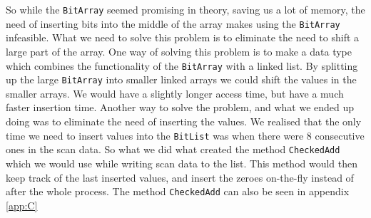 So while the \lstinline|BitArray| seemed promising in theory, saving us a lot of memory, the need of inserting bits into the middle of the array makes using the \lstinline|BitArray| infeasible.
What we need to solve this problem is to eliminate the need to shift a large part of the array. 
One way of solving this problem is to make a data type which combines the functionality of the \lstinline|BitArray| with a linked list. 
By splitting up the large \lstinline|BitArray| into smaller linked arrays we could shift the values in the smaller arrays. 
We would have a slightly longer access time, but have a much faster insertion time. 
Another way to solve the problem, and what we ended up doing was to eliminate the need of inserting the values. 
We realised that the only time we need to insert values into the \lstinline|BitList| was when there were 8 consecutive ones in the scan data. 
So what we did what created the method \lstinline|CheckedAdd| which we would use while writing scan data to the list. 
This method would then keep track of the last inserted values, and insert the zeroes on-the-fly instead of after the whole process. 
The method \lstinline|CheckedAdd| can also be seen in appendix \ref{app:C}
